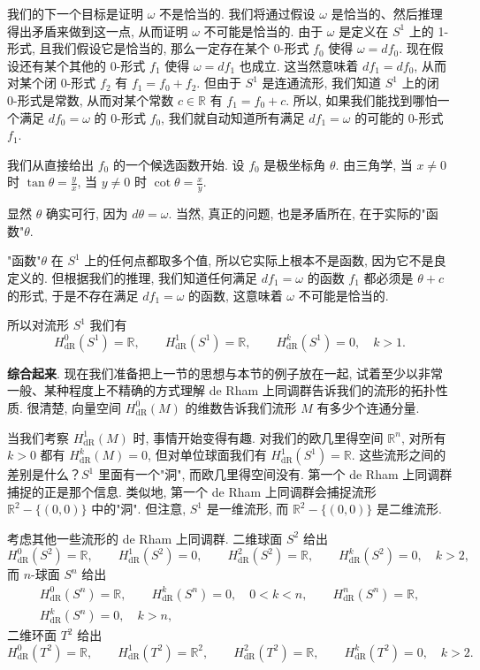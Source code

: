我们的下一个目标是证明 $\omega$ 不是恰当的. 我们将通过假设 $\omega$ 是恰当的、然后推理得出矛盾来做到这一点, 从而证明 $\omega$ 不可能是恰当的. 由于 $\omega$ 是定义在 $S^1$ 上的 1-形式, 且我们假设它是恰当的, 那么一定存在某个 0-形式 $f_0$ 使得 $\omega=df_0$. 现在假设还有某个其他的 0-形式 $f_1$ 使得 $\omega=df_1$ 也成立. 这当然意味着 $df_1=df_0$, 从而对某个闭 0-形式 $f_2$ 有 $f_1=f_0+f_2$. 但由于 $S^1$ 是连通流形, 我们知道 $S^1$ 上的闭 0-形式是常数, 从而对某个常数 $c\in\mathbb{R}$ 有 $f_1=f_0+c$. 所以, 如果我们能找到哪怕一个满足 $df_0=\omega$ 的 0-形式 $f_0$, 我们就自动知道所有满足 $df_1=\omega$ 的可能的 0-形式 $f_1$.

我们从直接给出 $f_0$ 的一个候选函数开始. 设 $f_0$ 是极坐标角 $\theta$. 由三角学, 当 $x\neq0$ 时 $\tan\theta=\frac{y}{x}$, 当 $y\neq0$ 时 $\cot\theta=\frac{x}{y}$.

显然 $\theta$ 确实可行, 因为 $d\theta=\omega$. 当然, 真正的问题, 也是矛盾所在, 在于实际的"函数"$\theta$.

"函数"$\theta$ 在 $S^1$ 上的任何点都取多个值, 所以它实际上根本不是函数, 因为它不是良定义的. 但根据我们的推理, 我们知道任何满足 $df_1=\omega$ 的函数 $f_1$ 都必须是 $\theta+c$ 的形式, 于是不存在满足 $df_1=\omega$ 的函数, 这意味着 $\omega$ 不可能是恰当的.

所以对流形 $S^1$ 我们有
\[
H_{\mathrm{dR}}^0(S^1)=\mathbb{R},\qquad
H_{\mathrm{dR}}^1(S^1)=\mathbb{R},\qquad
H_{\mathrm{dR}}^k(S^1)=0,\quad k>1.
\]

\textbf{综合起来}. 现在我们准备把上一节的思想与本节的例子放在一起, 试着至少以非常一般、某种程度上不精确的方式理解 de Rham 上同调群告诉我们的流形的拓扑性质. 很清楚, 向量空间 $H_{\mathrm{dR}}^0(M)$ 的维数告诉我们流形 $M$ 有多少个连通分量.

当我们考察 $H_{\mathrm{dR}}^1(M)$ 时, 事情开始变得有趣. 对我们的欧几里得空间 $\mathbb{R}^n$, 对所有 $k>0$ 都有 $H_{\mathrm{dR}}^k(M)=0$, 但对单位球面我们有 $H_{\mathrm{dR}}^1(S^1)=\mathbb{R}$. 这些流形之间的差别是什么？$S^1$ 里面有一个"洞", 而欧几里得空间没有. 第一个 de Rham 上同调群捕捉的正是那个信息. 类似地, 第一个 de Rham 上同调群会捕捉流形 $\mathbb{R}^2-\{(0,0)\}$ 中的"洞". 但注意, $S^1$ 是一维流形, 而 $\mathbb{R}^2-\{(0,0)\}$ 是二维流形.

考虑其他一些流形的 de Rham 上同调群. 二维球面 $S^2$ 给出
\[
H_{\mathrm{dR}}^0(S^2)=\mathbb{R},\qquad
H_{\mathrm{dR}}^1(S^2)=0,\qquad
H_{\mathrm{dR}}^2(S^2)=\mathbb{R},\qquad
H_{\mathrm{dR}}^k(S^2)=0,\quad k>2,
\]
而 $n$-球面 $S^n$ 给出
\begin{align*}
H_{\mathrm{dR}}^0(S^n)=\mathbb{R},\qquad
H_{\mathrm{dR}}^k(S^n)=0,\quad 0<k<n,\qquad
H_{\mathrm{dR}}^n(S^n)=\mathbb{R}, \\
H_{\mathrm{dR}}^k(S^n)=0,\quad k>n,
\end{align*}
二维环面 $T^2$ 给出
\[
H_{\mathrm{dR}}^0(T^2)=\mathbb{R},\qquad
H_{\mathrm{dR}}^1(T^2)=\mathbb{R}^2,\qquad
H_{\mathrm{dR}}^2(T^2)=\mathbb{R},\qquad
H_{\mathrm{dR}}^k(T^2)=0,\quad k>2.
\]

